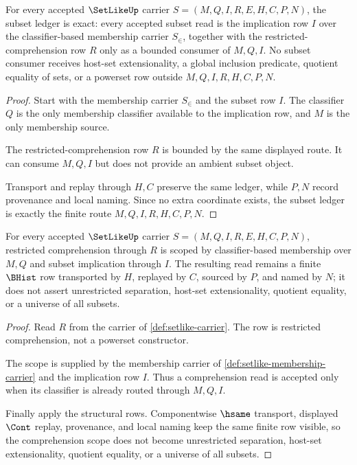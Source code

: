 \begin{theorem}
\label{thm:setlike-subset-ledger-exactness}
For every accepted $\SetLikeUp$ carrier $S=(M,Q,I,R,E,H,C,P,N)$, the subset ledger is exact: every accepted subset read is the implication row $I$ over the classifier-based membership carrier $S_{\in}$, together with the restricted-comprehension row $R$ only as a bounded consumer of $M,Q,I$. No subset consumer receives host-set extensionality, a global inclusion predicate, quotient equality of sets, or a powerset row outside $M,Q,I,R,H,C,P,N$.
\end{theorem}
\begin{proof}
Start with the membership carrier $S_{\in}$ and the subset row $I$. The classifier $Q$ is the only membership classifier available to the implication row, and $M$ is the only membership source.

The restricted-comprehension row $R$ is bounded by the same displayed route. It can consume $M,Q,I$ but does not provide an ambient subset object.

Transport and replay through $H,C$ preserve the same ledger, while $P,N$ record provenance and local naming. Since no extra coordinate exists, the subset ledger is exactly the finite route $M,Q,I,R,H,C,P,N$.
\end{proof}

\begin{theorem}
\label{thm:setlike-comprehension-scope}
For every accepted $\SetLikeUp$ carrier $S=(M,Q,I,R,E,H,C,P,N)$, restricted comprehension through $R$ is scoped by classifier-based membership over $M,Q$ and subset implication through $I$. The resulting read remains a finite $\BHist$ row transported by $H$, replayed by $C$, sourced by $P$, and named by $N$; it does not assert unrestricted separation, host-set extensionality, quotient equality, or a universe of all subsets.
\end{theorem}
\begin{proof}
Read $R$ from the carrier of \autoref{def:setlike-carrier}. The row is restricted comprehension, not a powerset constructor.

The scope is supplied by the membership carrier of \autoref{def:setlike-membership-carrier} and the implication row $I$. Thus a comprehension read is accepted only when its classifier is already routed through $M,Q,I$.

Finally apply the structural rows. Componentwise $\hsame$ transport, displayed $\Cont$ replay, provenance, and local naming keep the same finite row visible, so the comprehension scope does not become unrestricted separation, host-set extensionality, quotient equality, or a universe of all subsets.
\end{proof}

